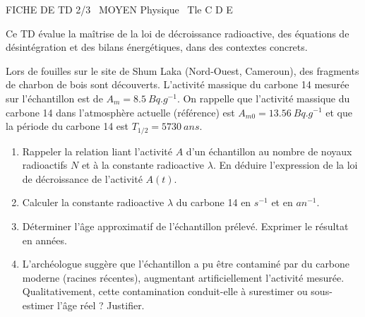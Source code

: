 \documentclass[11pt]{article}
\begin{document}
\begin{tcolorbox}[enhanced,colback=popink,colframe=popink,arc=10pt,boxrule=0pt,left=12pt,right=12pt,top=9pt,bottom=9pt]
{\color{white}\popxbold\small FICHE DE TD 2/3 \textbullet\ MOYEN \hfill Physique \textbullet\ Tle C D E\par}
\end{tcolorbox}
\vspace{4pt}
Ce TD évalue la maîtrise de la loi de décroissance radioactive, des équations de désintégration et des bilans énergétiques, dans des contextes concrets.

\begin{exercice}
Lors de fouilles sur le site de Shum Laka (Nord-Ouest, Cameroun), des fragments de charbon de bois sont découverts. L'activité massique du carbone 14 mesurée sur l'échantillon est de $A_m = \SI{8.5}{Bq.g^{-1}}$. On rappelle que l'activité massique du carbone 14 dans l'atmosphère actuelle (référence) est $A_{m0} = \SI{13.56}{Bq.g^{-1}}$ et que la période du carbone 14 est $T_{1/2} = \SI{5730}{ans}$.
\begin{enumerate}
    \item Rappeler la relation liant l'activité $A$ d'un échantillon au nombre de noyaux radioactifs $N$ et à la constante radioactive $\lambda$. En déduire l'expression de la loi de décroissance de l'activité $A(t)$.
    \item Calculer la constante radioactive $\lambda$ du carbone 14 en $\si{s^{-1}}$ et en $\si{an^{-1}}$.
    \item Déterminer l'âge approximatif de l'échantillon prélevé. Exprimer le résultat en années.
    \item L'archéologue suggère que l'échantillon a pu être contaminé par du carbone moderne (racines récentes), augmentant artificiellement l'activité mesurée. Qualitativement, cette contamination conduit-elle à surestimer ou sous-estimer l'âge réel ? Justifier.
\end{enumerate}
\end{exercice}
\end{document}

